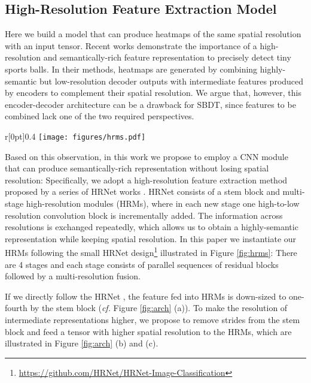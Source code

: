 \documentclass{bmvc2k}
\begin{document}
\subsection{High-Resolution Feature Extraction Model}
\label{sec:method:cnn}
Here we build a model that can produce heatmaps of the same spatial resolution  with an input tensor.
Recent works \cite{komorowski+2019mva,komorowski+2019visapp,zandycke+2019mmsports,sun+2020icpai,huang+2019avss,liu+2022cvprw} demonstrate the importance of a high-resolution and semantically-rich feature representation to precisely detect tiny sports balls.
In their methods, heatmaps are generated by combining highly-semantic but low-resolution decoder outputs with intermediate features produced by encoders to complement their spatial resolution.
We argue that, however, this encoder-decoder architecture can be a drawback for SBDT, since features to be combined lack one of the two required perspectives.
\par
\begin{wrapfigure}{r}[0pt]{0.4\textwidth}
\vspace*{-5mm}
\centering
\texttt{[image: figures/hrms.pdf]}
\caption{High-Resolution Modules (HRMs) of our SBDT method.}
\label{fig:hrms}
\end{wrapfigure}
Based on this observation, in this work we propose to employ a CNN module that can produce semantically-rich representation without losing spatial resolution:
Specifically, we adopt a high-resolution feature extraction method proposed by a series of HRNet works \cite{wang+2021tpami,yu+2021cvpr}.
HRNet consists of a stem block and multi-stage high-resolution modules (HRMs), where in each new stage one high-to-low resolution convolution block is incrementally added.
The information across resolutions is exchanged repeatedly, which allows us to obtain a highly-semantic representation while keeping spatial resolution.
In this paper we instantiate our HRMs following the small HRNet design\footnote{\url{https://github.com/HRNet/HRNet-Image-Classification}} illustrated in Figure \ref{fig:hrms}:
There are 4 stages and each stage consists of parallel sequences of residual blocks \cite{he+2016cvpr} followed by a multi-resolution fusion.
\par
If we directly follow the HRNet \cite{wang+2021tpami,yu+2021cvpr}, the feature fed into HRMs is down-sized to one-fourth by the stem block ({\it cf.} Figure \ref{fig:arch} (a)).
To make the resolution of intermediate representations higher, we propose to remove strides from the stem block and feed a tensor with higher spatial resolution to the HRMs, which are illustrated in Figure \ref{fig:arch} (b) and (c).
\end{document}

